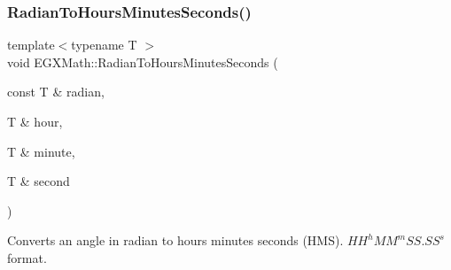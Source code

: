\subsubsection{\texorpdfstring{Radian\+To\+Hours\+Minutes\+Seconds()}{RadianToHoursMinutesSeconds()}}
{\footnotesize\ttfamily template$<$typename T $>$ \\
void E\+G\+X\+Math\+::\+Radian\+To\+Hours\+Minutes\+Seconds (\begin{DoxyParamCaption}\item[{const T \&}]{radian,  }\item[{T \&}]{hour,  }\item[{T \&}]{minute,  }\item[{T \&}]{second }\end{DoxyParamCaption})}



Converts an angle in radian to hours minutes seconds (H\+MS). ${HH}^h{MM}^m{SS.SS}^s$ format. 


